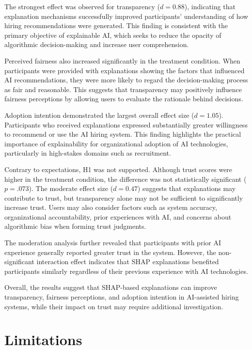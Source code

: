 \documentclass[conference]{IEEEtran}
\begin{document}
The strongest effect was observed for transparency ($d = 0.88$), indicating that explanation mechanisms successfully improved participants' understanding of how hiring recommendations were generated. This finding is consistent with the primary objective of explainable AI, which seeks to reduce the opacity of algorithmic decision-making and increase user comprehension.

Perceived fairness also increased significantly in the treatment condition. When participants were provided with explanations showing the factors that influenced AI recommendations, they were more likely to regard the decision-making process as fair and reasonable. This suggests that transparency may positively influence fairness perceptions by allowing users to evaluate the rationale behind decisions.

Adoption intention demonstrated the largest overall effect size ($d = 1.05$). Participants who received explanations expressed substantially greater willingness to recommend or use the AI hiring system. This finding highlights the practical importance of explainability for organizational adoption of AI technologies, particularly in high-stakes domains such as recruitment.

Contrary to expectations, H1 was not supported. Although trust scores were higher in the treatment condition, the difference was not statistically significant ($p = .073$). The moderate effect size ($d = 0.47$) suggests that explanations may contribute to trust, but transparency alone may not be sufficient to significantly increase trust. Users may also consider factors such as system accuracy, organizational accountability, prior experiences with AI, and concerns about algorithmic bias when forming trust judgments.

The moderation analysis further revealed that participants with prior AI experience generally reported greater trust in the system. However, the non-significant interaction effect indicates that SHAP explanations benefited participants similarly regardless of their previous experience with AI technologies.

Overall, the results suggest that SHAP-based explanations can improve transparency, fairness perceptions, and adoption intention in AI-assisted hiring systems, while their impact on trust may require additional investigation.

\section{Limitations}
\end{document}
